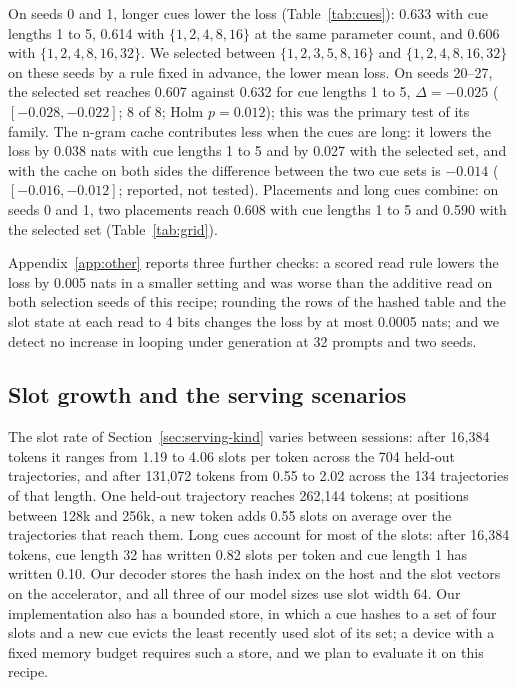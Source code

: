 On seeds 0 and 1, longer cues lower the loss (Table~\ref{tab:cues}): 0.633 with cue lengths 1 to
5, 0.614 with $\{1, 2, 4, 8, 16\}$ at the same parameter count, and 0.606 with $\{1, 2, 4, 8, 16,
32\}$. We selected between $\{1, 2, 3, 5, 8, 16\}$ and $\{1, 2, 4, 8, 16, 32\}$ on these seeds by
a rule fixed in advance, the lower mean loss. On seeds 20--27, the selected set reaches 0.607 against 0.632 for cue lengths 1
to 5, $\Delta = -0.025$ ($[-0.028, -0.022]$; 8 of 8; Holm $p = 0.012$); this was the primary test
of its family. The n-gram cache contributes less when the cues are long: it lowers the loss by
0.038 nats with cue lengths 1 to 5 and by 0.027 with the selected set, and with the cache on both
sides the difference between the two cue sets is $-0.014$ ($[-0.016, -0.012]$; reported, not
tested). Placements and long cues combine: on seeds 0 and 1, two placements reach 0.608 with cue
lengths 1 to 5 and 0.590 with the selected set (Table~\ref{tab:grid}).

Appendix~\ref{app:other} reports three further checks: a scored read rule lowers the loss by
0.005 nats in a smaller setting and was worse than the additive read on both selection seeds of
this recipe; rounding the rows of the hashed table and the slot state at each read to 4 bits
changes the loss by at most 0.0005 nats; and we detect no increase in looping under generation at 32 prompts and two seeds.

\subsection{Slot growth and the serving scenarios}
\label{app:serving}

The slot rate of Section~\ref{sec:serving-kind} varies between sessions: after 16,384 tokens it
ranges from 1.19 to 4.06 slots per token across the 704 held-out trajectories, and after 131,072
tokens from 0.55 to 2.02 across the 134 trajectories of that length. One held-out trajectory
reaches 262,144 tokens; at positions between 128k and 256k, a new token adds 0.55 slots on average
over the trajectories that reach them. Long cues account for most of the slots: after 16,384
tokens, cue length 32 has written 0.82 slots per token and cue length 1 has written 0.10. Our decoder stores the
hash index on the host and the slot vectors on the accelerator, and all three of our model sizes
use slot width 64. Our implementation also has a bounded store, in which a cue hashes to a set of
four slots and a new cue evicts the least recently used slot of its set; a device with a fixed
memory budget requires such a store, and we plan to evaluate it on this recipe.

